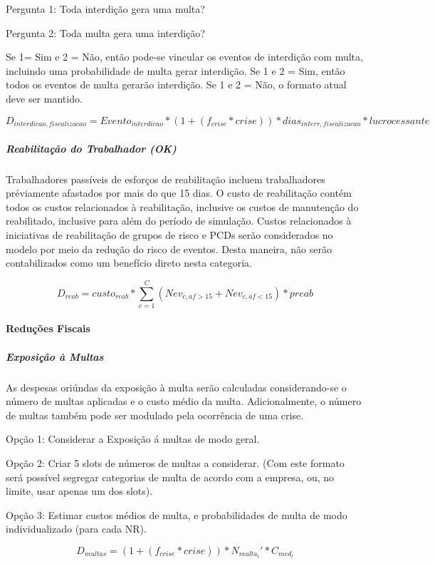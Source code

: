 \documentclass[]{article}
\let\oldparagraph\paragraph
\renewcommand{\paragraph}[1]{\oldparagraph{#1}\mbox{}}
\let\oldsubparagraph\subparagraph
\renewcommand{\subparagraph}[1]{\oldsubparagraph{#1}\mbox{}}
\begin{document}
Pergunta 1: Toda interdição gera uma multa?

Pergunta 2: Toda multa gera uma interdição?

Se 1= Sim e 2 = Não, então pode-se vincular os eventos de interdição com
multa, incluindo uma probabilidade de multa gerar interdição. Se 1 e 2 =
Sim, então todos os eventos de multa gerarão interdição. Se 1 e 2 = Não,
o formato atual deve ser mantido.

\[D_{interdicao, fiscalizacao} = Evento_{interdicao} * (1+(f_{crise}*crise)) * dias_{interr,fiscalizacao} * lucrocessante \]

\subparagraph{Reabilitação do Trabalhador
(OK)}\label{reabilitacao-do-trabalhador-ok}

Trabalhadores passíveis de esforços de reabilitação incluem
trabalhadores préviamente afastados por mais do que 15 dias. O custo de
reabilitação contém todos os custos relacionados à reabilitação,
inclusive os custos de manutenção do reabilitado, inclusive para além do
período de simulação. Custos relacionados à iniciativas de reabilitação
de grupos de risco e PCDs serão considerados no modelo por meio da
redução do risco de eventos. Desta maneira, não serão contabilizados
como um benefício direto nesta categoria.

\[D_{reab} = custo_{reab} * \sum_{c=1}^{C}(Nev_{c, af>15} + Nev_{c, af<15}) * preab \]

\paragraph{Reduções Fiscais}\label{reducoes-fiscais}

\subparagraph{Exposição à Multas}\label{exposicao-a-multas}

As despesas oriúndas da exposição à multa serão calculadas
considerando-se o número de multas aplicadas e o custo médio da multa.
Adicionalmente, o número de multas também pode ser modulado pela
ocorrência de uma crise.

Opção 1: Considerar a Exposição á multas de modo geral.

Opção 2: Criar 5 slots de números de multas a considerar. (Com este
formato será possível segregar categorias de multa de acordo com a
empresa, ou, no limite, usar apenas um dos slots).

Opção 3: Estimar custos médios de multa, e probabilidades de multa de
modo individualizado (para cada NR).

\[D_{multas}= (1+(f_{crise}*crise)) * N_{multa_l}' * C_{med_l}\]
\end{document}
